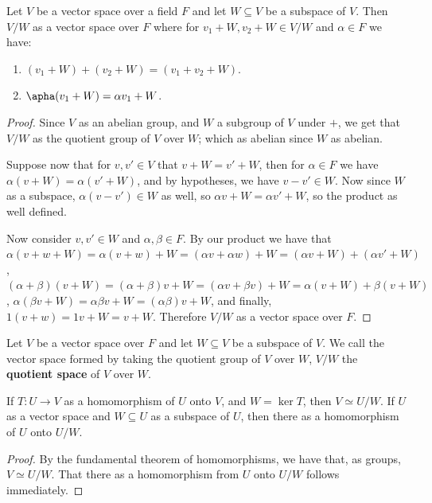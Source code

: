 \begin{lemma}
    Let $V$ be a vector space over a field  $F$ and let  $W \subseteq V$ be a
    subspace of  $V$. Then  $V/W$ as a vector space over  $F$ where for $
    v_1+W,v_2+W \in V/W$ and $\alpha \in F$ we have:
        \begin{enumerate}[label=(\arabic*)]
            \item $(v_1+W)+(v_2+W)=(v_1+v_2+W)$.

            \item $\apha(v_1+W)=\alpha v_1+W$.
        \end{enumerate}
\end{lemma}
\begin{proof}
    Since $V$ as an abelian group, and  $W$ a subgroup of  $V$ under  $+$, we
    get that  $V/W$ as the quotient group of  $V$ over  $W$; which as abelian
    since  $W$ as abelian.

    Suppose now that for $v,v' \in V$ that  $v+W=v'+W$, then for  $\alpha \in F$
    we have  $\alpha(v+W)=\alpha(v'+W)$, and by hypotheses, we have $v-v' \in
    W$. Now since  $W$ as a subspace,  $\alpha(v-v') \in W$ as well, so $\alpha
    v+W=\alpha v'+W$, so the product as well defined.

    Now consider  $v,v' \in W$ and  $\alpha, \beta \in F$. By our product we
    have that  $\alpha(v+w+W)=\alpha(v+w)+W=(\alpha v+ \alpha w)+W=(\alpha
    v+W)+(\alpha v'+W)$, $(\alpha+\beta)(v+W)=(\alpha+\beta)v+W=(\alpha v+\beta
    v)+W=\alpha(v+W)+\beta(v+W)$, $\alpha(\beta v+W)=\alpha\beta v+W=(\alpha\beta)
    v+W$, and finally, $1(v+w)=1v+W=v+W$. Therefore $V/W$ as a vector space over
     $F$.
\end{proof}

\begin{definition}
    Let $V$ be a vector space over  $F$ and let  $W \subseteq V$ be a subspace
    of  $V$. We call the vector space formed by taking the quotient group of
    $V$ over  $W$,  $V/W$ the  \textbf{quotient space} of $V$ over  $W$.
\end{definition}

\begin{theorem}
    If $T:U \rightarrow V$ as a homomorphism of $U$ onto  $V$, and  $W=\ker{T}$,
    then $V \simeq U/W$. If  $U$ as a vector space and  $W \subseteq U$ as a
    subspace of  $U$, then  there as a homomorphism of  $U$ onto  $U/W$.
\end{theorem}
\begin{proof}
    By the fundamental theorem of homomorphisms, we have that, as groups, $V
    \simeq U/W$. That there as a homomorphism from  $U$ onto  $U/W$ follows
    immediately.
\end{proof}

